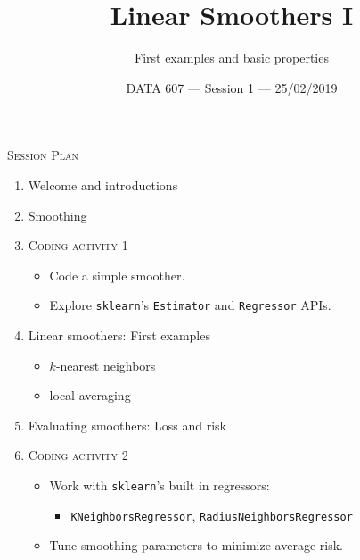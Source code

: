 \documentclass{beamer}
\begin{document}
    
\setlength{\parskip}{1em}
\begin{frame}
    \title{Linear Smoothers I}
    \subtitle{First examples and basic properties}
    \date{DATA 607 --- Session 1 --- 25/02/2019}
    \maketitle
\end{frame}


\begin{frame}{\textsc{Session Plan}}
    \begin{enumerate}
        \item Welcome and introductions
        \item Smoothing
        \item \textsc{Coding activity 1}
        \begin{itemize}
            \item Code a simple smoother.
            \item Explore \texttt{sklearn}'s \texttt{Estimator} and \texttt{Regressor} APIs.
        \end{itemize}
        \item Linear smoothers: First examples
        \begin{itemize}
            \item $k$-nearest neighbors
            \item local averaging
        \end{itemize}
        \item Evaluating smoothers: Loss and risk
        \item \textsc{Coding activity 2}
        \begin{itemize}
            \item Work with \texttt{sklearn}'s built in regressors:
            \begin{itemize}
                \item \texttt{KNeighborsRegressor}, \texttt{RadiusNeighborsRegressor}
            \end{itemize}
            \item Tune smoothing parameters to minimize average risk.
        \end{itemize}
    \end{enumerate}
\end{frame}
\end{document}
